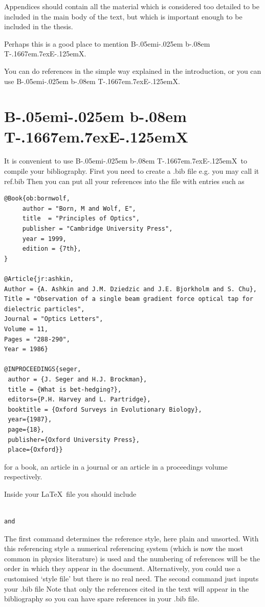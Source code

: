 \documentclass[12pt,a4paper]{report}
\def\BibTeX{{\rm B\kern-.05em{\sc i\kern-.025em b}\kern-.08em
    T\kern-.1667em\lower.7ex\hbox{E}\kern-.125emX}}
\begin{document}
Appendices should contain all the material which is considered too
detailed to be included in the main body of the text, but which is
important enough to be included in the thesis.

Perhaps this is a good place to mention \BibTeX.

You can do references in the simple way explained in the introduction,
or you can use \BibTeX.


\section{\BibTeX}
\label{sec:bibtex}

It is convenient to use \BibTeX\ to compile your bibliography.  First
you need to create a .bib file e.g.  you may call it ref.bib Then you
can put all your references into the file with entries such as
\begin{verbatim}
@Book{ob:bornwolf,
     author = "Born, M and Wolf, E",
     title  = "Principles of Optics",
     publisher = "Cambridge University Press",
     year = 1999,
     edition = {7th},
}

@Article{jr:ashkin,
Author = {A. Ashkin and J.M. Dziedzic and J.E. Bjorkholm and S. Chu},
Title = "Observation of a single beam gradient force optical tap for 
dielectric particles",
Journal = "Optics Letters",
Volume = 11,
Pages = "288-290",
Year = 1986}

@INPROCEEDINGS{seger,
 author = {J. Seger and H.J. Brockman},
 title = {What is bet-hedging?},
 editors={P.H. Harvey and L. Partridge},
 booktitle = {Oxford Surveys in Evolutionary Biology},
 year={1987},
 page={18},
 publisher={Oxford University Press},
 place={Oxford}}
\end{verbatim}
for a book, an article in a journal or an article in a proceedings volume
respectively.

Inside your \LaTeX\ file
you should include 
\begin{verbatim}
                      
and

\end{verbatim}
The first command determines the reference style, here plain and 
unsorted. With this referencing style 
a numerical referencing system (which is now the most
common in physics literature) is used and the numbering of references
will be the order in which they appear in the document. Alternatively, 
you could use
a customised `style file' but there is no real need.  The second
command just inputs your .bib file Note that only the references cited
in the text will appear in the bibliography so you can have spare
references in your .bib file.
\end{document}
